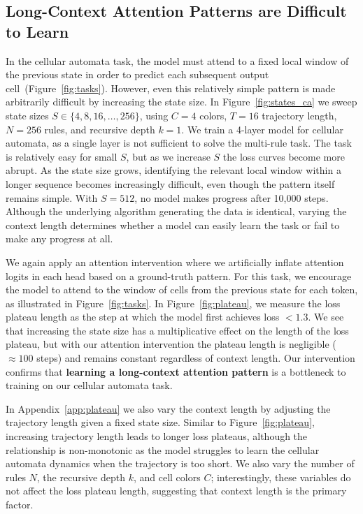 \documentclass{article}
\begin{document}
\subsection{Long-Context Attention Patterns are Difficult to Learn}
\label{sec:context}

In the cellular automata task, the model must attend to a fixed local window of the previous state in order to predict each subsequent output cell~(Figure~\ref{fig:tasks}). However, even this relatively simple pattern is made arbitrarily difficult by increasing the state size. In Figure~\ref{fig:states_ca} we sweep state sizes $S\in\{4, 8,16,\dots,256\}$, using $C=4$ colors, $T=16$ trajectory length, $N=256$ rules, and recursive depth $k=1$. 
We train a 4-layer model for cellular automata, as a single layer is not sufficient to solve the multi-rule task. The task is relatively easy for small $S$, but as we increase $S$ the loss curves become more abrupt. As the state size grows, identifying the relevant local window within a longer sequence becomes increasingly difficult, even though the pattern itself remains simple. With $S=512$, no model makes progress after 10,000 steps. Although the underlying algorithm generating the data is identical, varying the context length determines whether a model can easily learn the task or fail to make any progress at all.

We again apply an attention intervention where we artificially inflate attention logits in each head based on a ground-truth pattern. For this task, we encourage the model to attend to the window of cells from the previous state for each token, as illustrated in Figure~\ref{fig:tasks}. In Figure~\ref{fig:plateau}, we measure the loss plateau length as the step at which the model first achieves loss $<1.3$. We see that increasing the state size has a multiplicative effect on the length of the loss plateau, but with our attention intervention the plateau length is negligible ($\approx 100$ steps) and remains constant regardless of context length. Our intervention confirms that \textbf{learning a long-context attention pattern} is a bottleneck to training on our cellular automata task.

In Appendix~\ref{app:plateau} we also vary the context length by adjusting the trajectory length given a fixed state size. Similar to Figure~\ref{fig:plateau}, increasing trajectory length leads to longer loss plateaus, although the relationship is non-monotonic as the model struggles to learn the cellular automata dynamics when the trajectory is too short. We also vary the number of rules $N$, the recursive depth $k$, and cell colors $C$; interestingly, these variables do not affect the loss plateau length, suggesting that context length is the primary factor.
\end{document}
